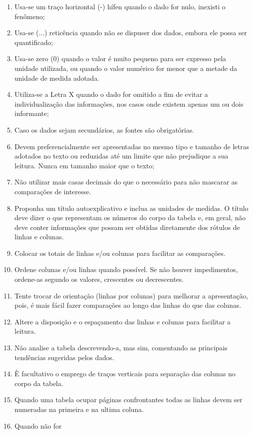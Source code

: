 \begin{enumerate}
\item Usa-se um traço horizontal (-) hífen quando o dado for nulo, inexisti o fenômeno; 
\item Usa-se (...) reticência quando não se dispuser dos dados,
embora ele possa ser quantificado; 
\item Usa-se zero (0) quando o valor é muito pequeno para ser expresso pela unidade utilizada, ou quando o valor numérico for menor que a metade da unidade de medida adotada.
\item Utiliza-se a Letra X quando o dado for omitido
a fim de evitar a individualização das
informações, nos casos onde existem
apenas um ou dois informante;
\item Caso os dados sejam secundários, as fontes são obrigatórias.
\item Devem preferencialmente ser apresentadas no mesmo tipo e tamanho de letras adotados no texto ou reduzidas até um limite que não prejudique a sua leitura. Nunca em tamanho maior que o texto;
\item Não utilizar mais casas decimais do que o necessário para
não mascarar as comparações de interesse. 
\item Proponha um título
autoexplicativo e inclua as unidades de medidas. O título deve
dizer o que representam os números do corpo da tabela e, em geral,
não deve conter informações que possam ser obtidas diretamente dos
rótulos de linhas e colunas. 
\item Colocar os totais de linhas
e/ou colunas para facilitar as comparações. 
\item Ordene colunas
e/ou linhas quando possível. Se não houver impedimentos, ordene-as
segundo os valores, crescentes ou decrescentes. 
\item Tente trocar
de orientação (linhas por colunas) para melhorar a apresentação,
pois, é mais fácil fazer comparações ao longo das linhas do que
das colunas. 
\item Altere a disposição e o espaçamento das linhas
e colunas para facilitar a leitura. 
\item Não analise a tabela
descrevendo-a, mas sim, comentando as principais tendências
sugeridas pelos dados. 
\item È facultativo o emprego de traços
verticais para separação das colunas no corpo da tabela. 
\item Quando
uma tabela ocupar páginas confrontantes todas as linhas devem ser
numeradas na primeira e na ultima coluna. 
\item Quando não for

\end{enumerate}
